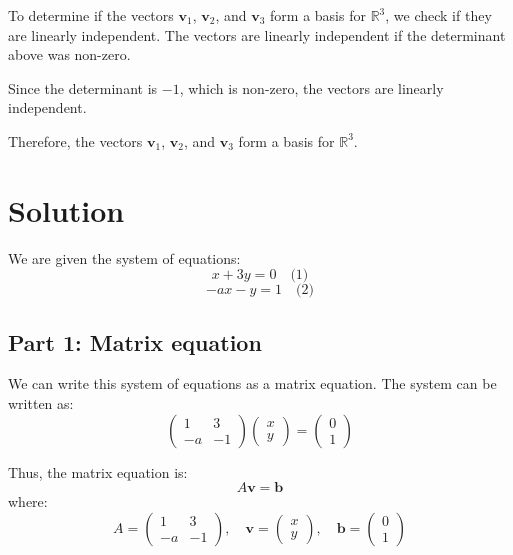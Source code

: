 \documentclass[11pt]{article}
\begin{document}
To determine if the vectors \( \mathbf{v}_1 \), \( \mathbf{v}_2 \), and \( \mathbf{v}_3 \) form a basis for \( \mathbb{R}^3 \), we check if they are linearly independent.
The vectors are linearly independent if the determinant above was non-zero.

Since the determinant is \( -1 \), which is non-zero, the vectors are linearly independent.

Therefore, the vectors \( \mathbf{v}_1 \), \( \mathbf{v}_2 \), and \( \mathbf{v}_3 \) form a basis for \( \mathbb{R}^3 \).




\newpage



\newpage

\section{Solution}

We are given the system of equations:
\[
x + 3y = 0 \quad \text{(1)}
\]
\[
-ax - y = 1 \quad \text{(2)}
\]

\subsection{Part 1: Matrix equation}

We can write this system of equations as a matrix equation. The system can be written as:
\[
\begin{pmatrix} 1 & 3 \\ -a & -1 \end{pmatrix} \begin{pmatrix} x \\ y \end{pmatrix} = \begin{pmatrix} 0 \\ 1 \end{pmatrix}
\]

Thus, the matrix equation is:
\[
A \mathbf{v} = \mathbf{b}
\]
where:
\[
A = \begin{pmatrix} 1 & 3 \\ -a & -1 \end{pmatrix}, \quad \mathbf{v} = \begin{pmatrix} x \\ y \end{pmatrix}, \quad \mathbf{b} = \begin{pmatrix} 0 \\ 1 \end{pmatrix}
\]
\end{document}
